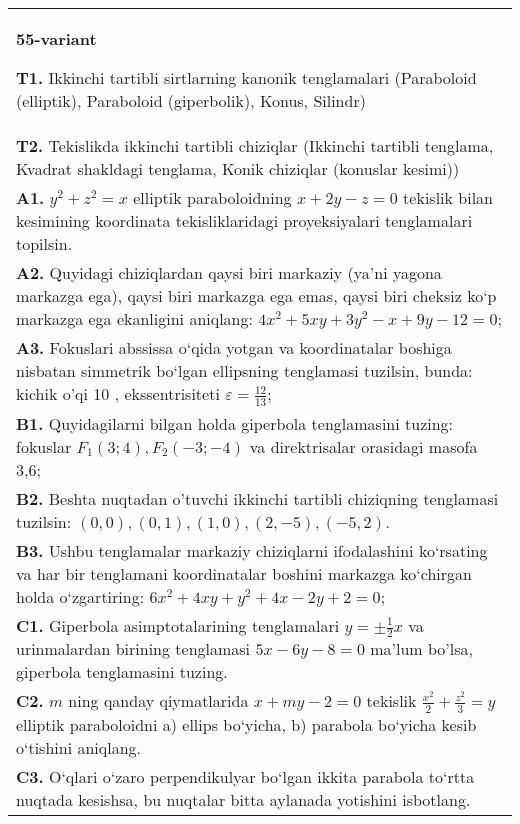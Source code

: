 \documentclass{article}
\begin{document}
\begin{tabular}{m{17cm}}
\textbf{55-variant}
\newline

\textbf{T1.} Ikkinchi tartibli sirtlarning kanonik tenglamalari (Paraboloid (elliptik), Paraboloid (giperbolik), Konus, Silindr) \\
\textbf{T2.} Tekislikda ikkinchi tartibli chiziqlar (Ikkinchi tartibli tenglama, Kvadrat shakldagi tenglama, Konik chiziqlar (konuslar kesimi)) \\
\textbf{A1.} $y^2+z^2=x$ elliptik paraboloidning $x+2 y-z=0$ tekislik bilan kesimining koordinata tekisliklaridagi proyeksiyalari tenglamalari topilsin. \\
\textbf{A2.} Quyidagi chiziqlardan qaysi biri markaziy (ya’ni yagona markazga ega), qaysi biri markazga ega emas, qaysi biri cheksiz ko‘p markazga ega ekanligini aniqlang: $4 x^2+5 x y+3 y^2-x+9 y-12=0$; \\
\textbf{A3.} Fokuslari abssissa o‘qida yotgan va koordinatalar boshiga nisbatan simmetrik bo‘lgan ellipsning tenglamasi tuzilsin, bunda: kichik o'qi 10 , ekssentrisiteti $\varepsilon=\frac{12}{13}$; \\
\textbf{B1.} Quyidagilarni bilgan holda giperbola tenglamasini tuzing: fokuslar $F_1 (3; 4), F_2 (-3;-4)$ va direktrisalar orasidagi masofa 3,6; \\
\textbf{B2.} Beshta nuqtadan o'tuvchi ikkinchi tartibli chiziqning tenglamasi tuzilsin: $(0,0),(0,1),(1,0),(2,-5),(-5,2)$. \\
\textbf{B3.} Ushbu tenglamalar markaziy chiziqlarni ifodalashini ko‘rsating va har bir tenglamani koordinatalar boshini markazga ko‘chirgan holda o‘zgartiring: $6 x^2+4 x y+y^2+4 x-2 y+2=0$; \\
\textbf{C1.} Giperbola asimptotalarining tenglamalari $y= \pm \frac{1}{2} x$ va urinmalardan birining tenglamasi $5 x-6 y-8=0$ ma'lum bo'lsa, giperbola tenglamasini tuzing. \\
\textbf{C2.} $m$ ning qanday qiymatlarida $x+m y-2=0$ tekislik $\frac{x^2}{2}+\frac{z^2}{3}=y$ elliptik paraboloidni a) ellips bo‘yicha, b) parabola bo‘yicha kesib o‘tishini aniqlang. \\
\textbf{C3.} O‘qlari o‘zaro perpendikulyar bo‘lgan ikkita parabola to‘rtta nuqtada kesishsa, bu nuqtalar bitta aylanada yotishini isbotlang. \\

\end{tabular}
\vspace{1cm}
\end{document}

